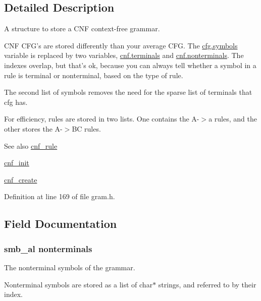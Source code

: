 \subsection{\-Detailed \-Description}
\-A structure to store a \-C\-N\-F context-\/free grammar. 

\-C\-N\-F \-C\-F\-G's are stored differently than your average \-C\-F\-G. \-The \hyperlink{structcfg_af90e802d07cdf4a88bde8043b57ec666}{cfg.\-symbols} variable is replaced by two variables, \hyperlink{structcnf_ae85a135e82c4af0e75739a21b3ec03b4}{cnf.\-terminals} and \hyperlink{structcnf_a48ad19ba58732910c48d1e821a3ea428}{cnf.\-nonterminals}. \-The indexes overlap, but that's ok, because you can always tell whether a symbol in a rule is terminal or nonterminal, based on the type of rule.

\-The second list of symbols removes the need for the sparse list of terminals that cfg has.

\-For efficiency, rules are stored in two lists. \-One contains the \-A-\/$>$a rules, and the other stores the \-A-\/$>$\-B\-C rules.

\begin{DoxySeeAlso}{\-See also}
\hyperlink{structcnf__rule}{cnf\-\_\-rule} 

\hyperlink{gram_8h_a6498d2481623fd5851966f63bb2d8008}{cnf\-\_\-init} 

\hyperlink{gram_8h_a3a4d3ef76c22529d33625b34667dce89}{cnf\-\_\-create} 
\end{DoxySeeAlso}


\-Definition at line 169 of file gram.\-h.



\subsection{\-Field \-Documentation}
\hypertarget{structcnf_a48ad19ba58732910c48d1e821a3ea428}{
\subsubsection[{nonterminals}]{\setlength{\rightskip}{0pt plus 5cm}smb\-\_\-al {\bf nonterminals}}}\label{structcnf_a48ad19ba58732910c48d1e821a3ea428}


\-The nonterminal symbols of the grammar. 

\-Nonterminal symbols are stored as a list of char$\ast$ strings, and referred to by their index. 

